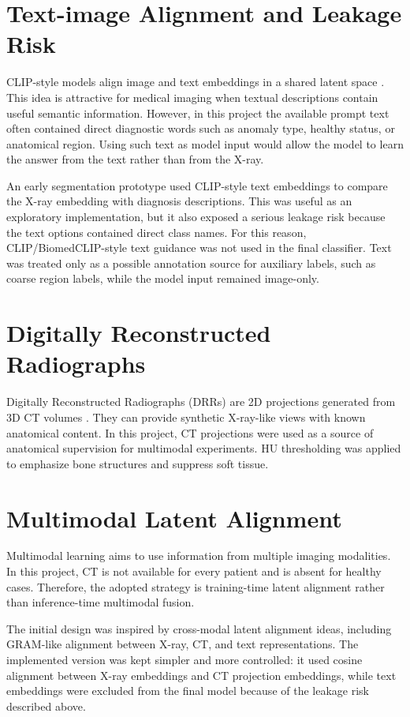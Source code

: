 \section{Text-image Alignment and Leakage Risk}
CLIP-style models align image and text embeddings in a shared latent space \cite{radford2021clip}. This idea is attractive for medical imaging when textual descriptions contain useful semantic information. However, in this project the available prompt text often contained direct diagnostic words such as anomaly type, healthy status, or anatomical region. Using such text as model input would allow the model to learn the answer from the text rather than from the X-ray.

An early segmentation prototype used CLIP-style text embeddings to compare the X-ray embedding with diagnosis descriptions. This was useful as an exploratory implementation, but it also exposed a serious leakage risk because the text options contained direct class names. For this reason, CLIP/BiomedCLIP-style text guidance was not used in the final classifier. Text was treated only as a possible annotation source for auxiliary labels, such as coarse region labels, while the model input remained image-only.

\section{Digitally Reconstructed Radiographs}
Digitally Reconstructed Radiographs (DRRs) are 2D projections generated from 3D CT volumes \cite{sherouse1990drr}. They can provide synthetic X-ray-like views with known anatomical content. In this project, CT projections were used as a source of anatomical supervision for multimodal experiments. HU thresholding was applied to emphasize bone structures and suppress soft tissue.

\section{Multimodal Latent Alignment}
Multimodal learning aims to use information from multiple imaging modalities. In this project, CT is not available for every patient and is absent for healthy cases. Therefore, the adopted strategy is training-time latent alignment rather than inference-time multimodal fusion.

The initial design was inspired by cross-modal latent alignment ideas, including GRAM-like alignment between X-ray, CT, and text representations. The implemented version was kept simpler and more controlled: it used cosine alignment between X-ray embeddings and CT projection embeddings, while text embeddings were excluded from the final model because of the leakage risk described above.

